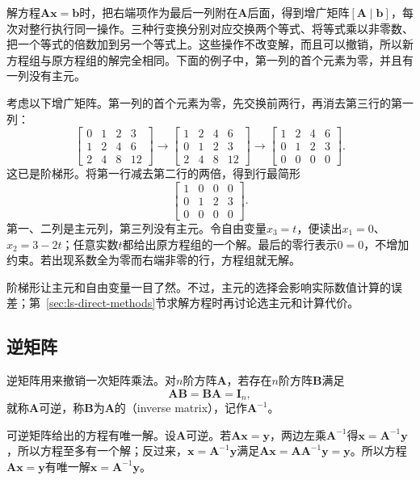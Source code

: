 解方程$\bm A\bm x=\bm b$时，把右端项作为最后一列附在$\bm A$后面，得到增广矩阵$[\bm A\mid\bm b]$，每次对整行执行同一操作。三种行变换分别对应交换两个等式、将等式乘以非零数、把一个等式的倍数加到另一个等式上。这些操作不改变解，而且可以撤销，所以新方程组与原方程组的解完全相同。下面的例子中，第一列的首个元素为零，并且有一列没有主元。
\begin{example}[换行、消元与自由变量]
\label{ex:ls-elementary-row-reduction}
考虑以下增广矩阵。第一列的首个元素为零，先交换前两行，再消去第三行的第一列：
\[
 \left[\begin{array}{ccc|c}0&1&2&3\\1&2&4&6\\2&4&8&12\end{array}\right]
 \longrightarrow
 \left[\begin{array}{ccc|c}1&2&4&6\\0&1&2&3\\2&4&8&12\end{array}\right]
 \longrightarrow
 \left[\begin{array}{ccc|c}1&2&4&6\\0&1&2&3\\0&0&0&0\end{array}\right].
\]
这已是阶梯形。将第一行减去第二行的两倍，得到行最简形
\[
 \left[\begin{array}{ccc|c}1&0&0&0\\0&1&2&3\\0&0&0&0\end{array}\right].
\]
第一、二列是主元列，第三列没有主元。令自由变量$x_3=t$，便读出$x_1=0$、$x_2=3-2t$；任意实数$t$都给出原方程组的一个解。最后的零行表示$0=0$，不增加约束。若出现系数全为零而右端非零的行，方程组就无解。
\end{example}

阶梯形让主元和自由变量一目了然。不过，主元的选择会影响实际数值计算的误差；第~\ref{sec:ls-direct-methods}节求解方程时再讨论选主元和计算代价。

\subsection{逆矩阵}
\label{sec:prelim-inverse-matrices}

逆矩阵用来撤销一次矩阵乘法。对$n$阶方阵$\bm A$，若存在$n$阶方阵$\bm B$满足
\[
 \bm A\bm B=\bm B\bm A=\bm I_n,
\]
就称$\bm A$可逆，称$\bm B$为$\bm A$的（inverse matrix），记作$\bm A^{-1}$。

可逆矩阵给出的方程有唯一解。设$\bm A$可逆。若$\bm A\bm x=\bm y$，两边左乘$\bm A^{-1}$得$\bm x=\bm A^{-1}\bm y$，所以方程至多有一个解；反过来，$\bm x=\bm A^{-1}\bm y$满足$\bm A\bm x=\bm A\bm A^{-1}\bm y=\bm y$。所以方程$\bm A\bm x=\bm y$有唯一解$\bm x=\bm A^{-1}\bm y$。

